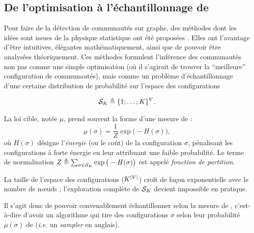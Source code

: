 \subsection{De l'optimisation à l'échantillonnage de }

Pour faire de la détection de communautés sur graphe, des méthodes dont les idées sont issues de la physique statistique ont été proposées \cite{Reichardt2006, ConstantPottsModel}.
Elles ont l'avantage d'être intuitives, élégantes mathématiquement, ainsi que de pouvoir être analysées théoriquement.
Ces méthodes formulent l'inférence des communautés non pas comme une simple optimisation (où il s'agirait de trouver la ``meilleure'' configuration de communautés), mais comme un problème d'échantillonnage d'une certaine distribution de probabilité sur l'espace des configurations 

\[
\mathcal S_K \triangleq \{1 ; \dots ; K\}^V.
\]

La loi cible, notée $\mu$, prend souvent la forme d'une mesure de  \cite{Parisi} :
\[
\mu(\sigma) = \frac{1}{Z} \exp\big(- H(\sigma)\big), 
\]
où $H(\sigma)$ désigne l'\emph{énergie} (ou le coût) de la configuration $\sigma$, pénalisant les configurations à forte énergie en leur attribuant une faible probabilité. 
Le terme de normalisation $Z \triangleq \sum_{\sigma \in \mathcal S_K} \exp\big(- H(\sigma)\big)$ est appelé \emph{fonction de partition}.

La taille de l'espace des configurations ($K^{\lvert V \rvert}$) croît de façon exponentielle avec le nombre de nœuds ; l'exploration complète de $\mathcal S_K$ devient impossible en pratique. 

Il s'agit donc de pouvoir convenablement échantillonner selon la mesure de , c'est-à-dire d'avoir un algorithme qui tire des configurations $\sigma$ selon leur probabilité $\mu(\sigma)$ de  (\emph{i.e.} un \emph{ sampler} en anglais).




